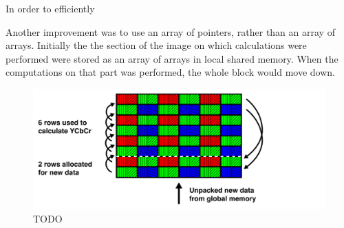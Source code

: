 In order to efficiently

Another improvement was to use an array of pointers, rather than an array of arrays.
Initially the the section of the image on which calculations were performed were stored as an array of arrays in local shared memory.
When the computations on that part was performed, the whole block would move down.
\begin{figure}[H]
    \centering
    \includegraphics[width=\textwidth]{figures/polarized_image/rolling.pdf}
    \caption{TODO}
\end{figure}
